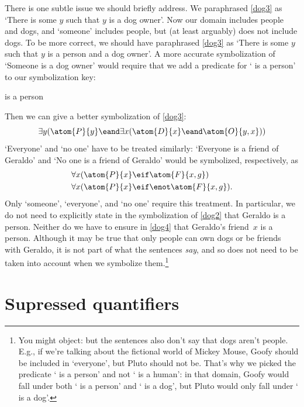 There is one subtle issue we should briefly address. We paraphrased
\cref{dog3} as `There is some $y$ such that $y$ is a dog owner'.
Now our domain includes people and dogs, and `someone' includes
people, but (at least arguably) does not include dogs.  To be more
correct, we should have paraphrased \cref*{dog3} as `There is
some $y$ such that $y$ is a person and a dog owner'. A more accurate
symbolization of `Someone is a dog owner' would require that we add a
predicate for `\blank{} is a person' to our symbolization key:
\begin{ekey}
	\item[\atom{P}{x}]  is a person
\end{ekey}
Then we can give a better symbolization of \cref{dog3}:
$$\exists y (\atom{P}{y} \eand \exists x(\atom{D}{x} \eand
\atom{O}{y,x}))$$
`Everyone' and `no one' have to be treated similarly: `Everyone
is a friend of Geraldo' and `No one is a friend of Geraldo' would be
symbolized, respectively, as
\begin{align*}
	& \forall x(\atom{P}{x} \eif \atom{F}{x,g})\\
	& \forall x(\atom{P}{x} \eif \enot\atom{F}{x,g}).
\end{align*}
Only `someone', `everyone', and `no one' require this treatment. In
particular, we do not need to explicitly state in the symbolization of
\cref{dog2} that Geraldo is a person. Neither do we have to
ensure in \cref{dog4} that Geraldo's friend~$x$ is a person.
Although it may be true that only people can own dogs or be friends
with Geraldo, it is not part of what the sentences \emph{say}, and so
does not need to be taken into account when we symbolize
them.\footnote{You might object: but the sentences also don't say that
dogs aren't people. E.g., if we're talking about the fictional world
of Mickey Mouse, Goofy should be included in `everyone', but Pluto
should not be.  That's why we picked the predicate `\blank{} is a
person' and not `\blank{} is a human': in that domain, Goofy would
fall under both `\blank{} is a person' and `\blank{} is a dog', but
Pluto would only fall under `\blank{} is a dog'.}

\section{Supressed quantifiers}\label{ss:SuppQuant}

